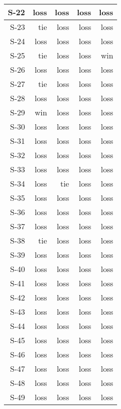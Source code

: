 \begin{tabular}{ | r | r | r | r | r | }
    \hline
         S-22  &   loss  &   loss  &   loss  &   loss  \\
    \hline
         S-23  &    tie  &   loss  &   loss  &   loss  \\
    \hline
         S-24  &   loss  &   loss  &   loss  &   loss  \\
    \hline
         S-25  &    tie  &   loss  &   loss  &    win  \\
    \hline
         S-26  &   loss  &   loss  &   loss  &   loss  \\
    \hline
         S-27  &    tie  &   loss  &   loss  &   loss  \\
    \hline
         S-28  &   loss  &   loss  &   loss  &   loss  \\
    \hline
         S-29  &    win  &   loss  &   loss  &   loss  \\
    \hline
         S-30  &   loss  &   loss  &   loss  &   loss  \\
    \hline
         S-31  &   loss  &   loss  &   loss  &   loss  \\
    \hline
         S-32  &   loss  &   loss  &   loss  &   loss  \\
    \hline
         S-33  &   loss  &   loss  &   loss  &   loss  \\
    \hline
         S-34  &   loss  &    tie  &   loss  &   loss  \\
    \hline
         S-35  &   loss  &   loss  &   loss  &   loss  \\
    \hline
         S-36  &   loss  &   loss  &   loss  &   loss  \\
    \hline
         S-37  &   loss  &   loss  &   loss  &   loss  \\
    \hline
         S-38  &    tie  &   loss  &   loss  &   loss  \\
    \hline
         S-39  &   loss  &   loss  &   loss  &   loss  \\
    \hline
         S-40  &   loss  &   loss  &   loss  &   loss  \\
    \hline
         S-41  &   loss  &   loss  &   loss  &   loss  \\
    \hline
         S-42  &   loss  &   loss  &   loss  &   loss  \\
    \hline
         S-43  &   loss  &   loss  &   loss  &   loss  \\
    \hline
         S-44  &   loss  &   loss  &   loss  &   loss  \\
    \hline
         S-45  &   loss  &   loss  &   loss  &   loss  \\
    \hline
         S-46  &   loss  &   loss  &   loss  &   loss  \\
    \hline
         S-47  &   loss  &   loss  &   loss  &   loss  \\
    \hline
         S-48  &   loss  &   loss  &   loss  &   loss  \\
    \hline
         S-49  &   loss  &   loss  &   loss  &   loss  \\
    \hline
\end{tabular}


